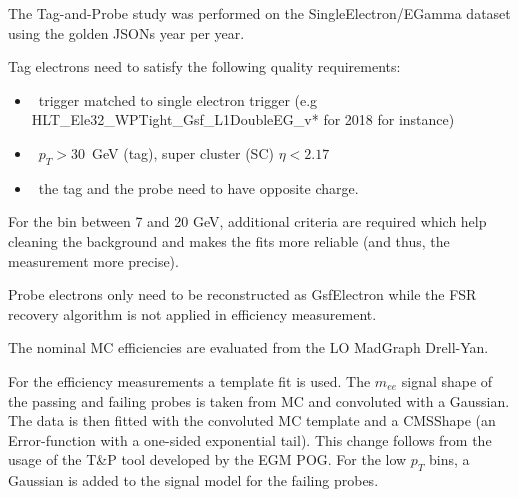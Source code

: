 The Tag-and-Probe study was performed on the SingleElectron/EGamma dataset using the golden JSONs year per year.  

Tag electrons need to satisfy the following quality requirements:
\begin{itemize}
\item~trigger matched to single electron trigger (e.g HLT\_Ele32\_WPTight\_Gsf\_L1DoubleEG\_v* for 2018 for instance)
\item~$p_{T} > 30$~GeV (tag), super cluster (SC) $\eta < 2.17$%
\item~the tag and the probe need to have opposite charge.
\end{itemize}

For the bin between 7 and 20 GeV, additional criteria are required 
which help cleaning the background and makes the fits more reliable (and thus, the measurement more precise).

Probe electrons only need to be reconstructed as GsfElectron while the FSR recovery algorithm is not applied in efficiency measurement. 

The nominal MC efficiencies are evaluated from the LO MadGraph Drell-Yan.

For the efficiency measurements a template fit is used. The $m_{ee}$ signal shape of the passing and failing probes is taken from MC and convoluted with a Gaussian. The data is then fitted with the convoluted MC template and a CMSShape (an Error-function with a one-sided exponential tail). This change follows from the usage of the T\&P tool developed by the EGM POG. For the low $p_T$ bins, a Gaussian is added to the signal model for the failing probes. 


